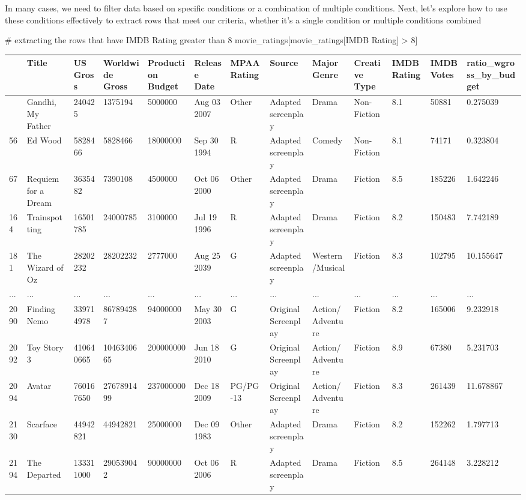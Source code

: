 \documentclass[
  letterpaper,
  DIV=11,
  numbers=noendperiod]{scrreprt}
\newenvironment{Shaded}{\begin{snugshade}}{\end{snugshade}}
\newcommand{\CommentTok}[1]{\textcolor[rgb]{0.37,0.37,0.37}{#1}}
\newcommand{\DecValTok}[1]{\textcolor[rgb]{0.68,0.00,0.00}{#1}}
\newcommand{\NormalTok}[1]{\textcolor[rgb]{0.00,0.23,0.31}{#1}}
\newcommand{\OperatorTok}[1]{\textcolor[rgb]{0.37,0.37,0.37}{#1}}
\newcommand{\StringTok}[1]{\textcolor[rgb]{0.13,0.47,0.30}{#1}}
\begin{document}
In many cases, we need to filter data based on specific conditions or a
combination of multiple conditions. Next, let's explore how to use these
conditions effectively to extract rows that meet our criteria, whether
it's a single condition or multiple conditions combined

\begin{Shaded}
\begin{Highlighting}[]
\CommentTok{\# extracting the rows that have IMDB Rating greater than 8}
\NormalTok{movie\_ratings[movie\_ratings[}\StringTok{\textquotesingle{}IMDB Rating\textquotesingle{}}\NormalTok{] }\OperatorTok{\textgreater{}} \DecValTok{8}\NormalTok{]}
\end{Highlighting}
\end{Shaded}

\begin{longtable}[]{@{}lllllllllllll@{}}
\toprule\noalign{}
& Title & US Gross & Worldwide Gross & Production Budget & Release Date
& MPAA Rating & Source & Major Genre & Creative Type & IMDB Rating &
IMDB Votes & ratio\_wgross\_by\_budget \\
\midrule\noalign{}
\endhead
\bottomrule\noalign{}
\endlastfoot
21 & Gandhi, My Father & 240425 & 1375194 & 5000000 & Aug 03 2007 &
Other & Adapted screenplay & Drama & Non-Fiction & 8.1 & 50881 &
0.275039 \\
56 & Ed Wood & 5828466 & 5828466 & 18000000 & Sep 30 1994 & R & Adapted
screenplay & Comedy & Non-Fiction & 8.1 & 74171 & 0.323804 \\
67 & Requiem for a Dream & 3635482 & 7390108 & 4500000 & Oct 06 2000 &
Other & Adapted screenplay & Drama & Fiction & 8.5 & 185226 &
1.642246 \\
164 & Trainspotting & 16501785 & 24000785 & 3100000 & Jul 19 1996 & R &
Adapted screenplay & Drama & Fiction & 8.2 & 150483 & 7.742189 \\
181 & The Wizard of Oz & 28202232 & 28202232 & 2777000 & Aug 25 2039 & G
& Adapted screenplay & Western/Musical & Fiction & 8.3 & 102795 &
10.155647 \\
... & ... & ... & ... & ... & ... & ... & ... & ... & ... & ... & ... &
... \\
2090 & Finding Nemo & 339714978 & 867894287 & 94000000 & May 30 2003 & G
& Original Screenplay & Action/Adventure & Fiction & 8.2 & 165006 &
9.232918 \\
2092 & Toy Story 3 & 410640665 & 1046340665 & 200000000 & Jun 18 2010 &
G & Original Screenplay & Action/Adventure & Fiction & 8.9 & 67380 &
5.231703 \\
2094 & Avatar & 760167650 & 2767891499 & 237000000 & Dec 18 2009 &
PG/PG-13 & Original Screenplay & Action/Adventure & Fiction & 8.3 &
261439 & 11.678867 \\
2130 & Scarface & 44942821 & 44942821 & 25000000 & Dec 09 1983 & Other &
Adapted screenplay & Drama & Fiction & 8.2 & 152262 & 1.797713 \\
2194 & The Departed & 133311000 & 290539042 & 90000000 & Oct 06 2006 & R
& Adapted screenplay & Drama & Fiction & 8.5 & 264148 & 3.228212 \\
\end{longtable}
\end{document}
